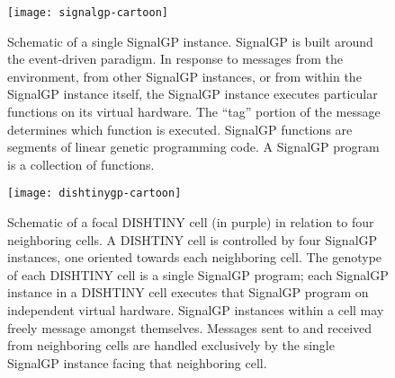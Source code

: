 \begin{figure*}[t]
\begin{center}

\caption{
Schematics detailing the structure of a SignalGP instance (\ref{fig:signalgp-cartoon}) and DISHTINY cell, which is controlled by SignalGP instances (\ref{fig:dishtinygp-cartoon}).
We chose to implement SignalGP with DISHTINY because its event-driven design facilitates the evolution of behaviors that are responsive to cues from the environment and from other agents.
Within a DISHTINY cell, we mirror a single SignalGP program across instances oriented in each cardinal direction in order to facilitate the evolution of behavior that is symmetric with respect to direction (e.g., responds equivalently to an event if it occurs to the North, South, East, or West).
}
\label{fig:signalgp-dishtinygp}

\begin{subfigure}[b]{0.4\linewidth}
\texttt{[image: signalgp-cartoon]}%
\vspace{3ex}
\caption{
Schematic of a single SignalGP instance.
SignalGP is built around the event-driven paradigm.
In response to messages from the environment, from other SignalGP instances, or from within the SignalGP instance itself, the SignalGP instance executes particular functions on its virtual hardware.
The ``tag'' portion of the message determines which function is executed.
SignalGP functions are segments of linear genetic programming code.
A SignalGP program is a collection of functions.
}
\label{fig:signalgp-cartoon}
\end{subfigure}%
\hspace{0.1\linewidth}
\begin{subfigure}[b]{0.4\linewidth}
\texttt{[image: dishtinygp-cartoon]}
\vspace{3ex}
\caption{
Schematic of a focal DISHTINY cell (in purple) in relation to four neighboring cells.
A DISHTINY cell is controlled by four SignalGP instances, one oriented towards each neighboring cell.
The genotype of each DISHTINY cell is a single SignalGP program;
each SignalGP instance in a DISHTINY cell executes that SignalGP program on independent virtual hardware.
SignalGP instances within a cell may freely message amongst themselves.
Messages sent to and received from neighboring cells are handled exclusively by the single SignalGP instance facing that neighboring cell.
}
\label{fig:dishtinygp-cartoon}
\end{subfigure}

\end{center}
\end{figure*}
